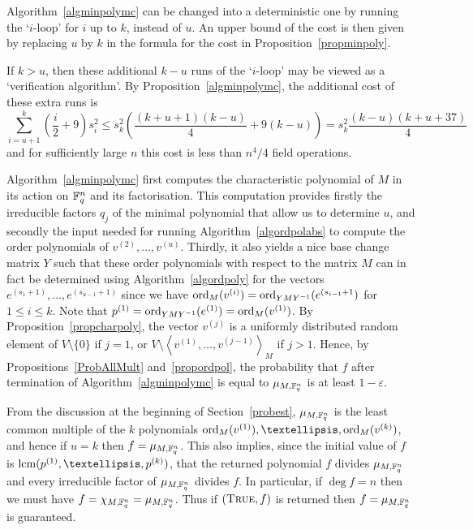 \begin{Rem}
    \label{algdeterm}
    Algorithm~\ref{algminpolymc} can be changed into a deterministic
    one by running the `$i$-loop' for $i$ up to $k$, instead of $u$. An upper
    bound of the cost is then given by replacing $u$ by $k$ in the
    formula for the cost in Proposition~\ref{propminpoly}.

If $k>u$, then these additional $k-u$ runs of the `$i$-loop' may be viewed as 
a `verification  algorithm'. By Proposition~\ref{algminpolymc}, 
the additional cost of these extra runs is
\[
\sum_{i=u+1}^k(\frac{i}{2}+9)s_i^2 \leq s_k^2\left(\frac{(k+u+1)(k-u)}{4}+9(k-u)\right)
= s_k^2\frac{(k-u)(k+u+37)}{4}
\]
and for sufficiently large $n$ this cost is less than 
$n^4/4$ field operations.
\end{Rem}

Algorithm~\ref{algminpolymc} first computes the characteristic
polynomial of $M$ in its action on $\mathbb{F}_q^n$ and its factorisation.
This computation provides firstly the irreducible factors $q_j$ of
the minimal polynomial that allow us to determine $u$, and secondly
the input needed for running Algorithm~\ref{algordpolabs} to compute
the order polynomials of $v^{(2)}, \ldots, 
v^{(u)}$. Thirdly, it also yields a nice base change matrix $Y$ such 
that these order polynomials with respect to the matrix $M$ can in
fact be determined using Algorithm~\ref{algordpoly} for the vectors
$e^{(s_1+1)},\ldots,e^{(s_{u-1}+1)}$ since we have
$\mathrm{ord}_M(v^{(i)}) = \mathrm{ord}_{YMY^{-1}}(e^{(s_{i-1}+1})$ for $1 \le i \le
k$. Note that
$p^{(1)} = \mathrm{ord}_{YMY^{-1}}(e^{(1)}) = \mathrm{ord}_M(v^{(1)})$. 
By Proposition~\ref{propcharpoly},
the vector $v^{(j)}$ is a uniformly distributed random element of
$V\setminus\{0\}$ if $j=1$, or $V\setminus\left< v^{(1)}, \ldots,
v^{(j-1)}\right>_M$ if $j>1$. Hence, by Propositions~\ref{ProbAllMult}
and~\ref{propordpol}, the probability that $f$ after termination of
Algorithm~\ref{algminpolymc} is equal to $\mu_{M,\mathbb{F}_q^n}$ is at least
$1-\varepsilon$.

  From the discussion at the beginning of Section~\ref{probest},
$\mu_{M,\mathbb{F}_q^n}$ is the least common multiple of the $k$ polynomials
$\ord_M(v^{(1)}), \dots,\ord_M(v^{(k)})$, and hence if $u=k$ then
$f = \mu_{M,\mathbb{F}_q^n}$. This also implies, since the initial value
of $f$ is $\lcm(p^{(1)}, \ldots, p^{(k)})$, that the returned
polynomial $f$ divides $\mu_{M,\mathbb{F}_q^n}$ and every irreducible factor of
$\mu_{M,\mathbb{F}_q^n}$ divides $f$. In particular, if $\deg f =n$ then we must
have $f=\chi_{M,\mathbb{F}_q^n}=\mu_{M,\mathbb{F}_q^n}$. Thus if $(\mbox{\sc True},f)$
is returned then $f = \mu_{M,\mathbb{F}_q^n}$ is guaranteed.


